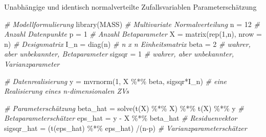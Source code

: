 \documentclass[
  8pt,
  ignorenonframetext,
]{beamer}
\newenvironment{Shaded}{\begin{snugshade}}{\end{snugshade}}
\newcommand{\AttributeTok}[1]{\textcolor[rgb]{0.77,0.63,0.00}{#1}}
\newcommand{\CommentTok}[1]{\textcolor[rgb]{0.56,0.35,0.01}{\textit{#1}}}
\newcommand{\DecValTok}[1]{\textcolor[rgb]{0.00,0.00,0.81}{#1}}
\newcommand{\FunctionTok}[1]{\textcolor[rgb]{0.00,0.00,0.00}{#1}}
\newcommand{\NormalTok}[1]{#1}
\newcommand{\OtherTok}[1]{\textcolor[rgb]{0.56,0.35,0.01}{#1}}
\newcommand{\SpecialCharTok}[1]{\textcolor[rgb]{0.00,0.00,0.00}{#1}}
\begin{document}
\begin{frame}[fragile]{Unabhängige und identisch normalverteilte
Zufallsvariablen}
\protect\hypertarget{unabhuxe4ngige-und-identisch-normalverteilte-zufallsvariablen-3}{}
Parameterschätzung \vspace{1mm}

\tiny

\begin{Shaded}
\begin{Highlighting}[]
\CommentTok{\# Modellformulierung}
\FunctionTok{library}\NormalTok{(MASS)                                     }\CommentTok{\# Multivariate Normalverteilung}
\NormalTok{n          }\OtherTok{=} \DecValTok{12}                                   \CommentTok{\# Anzahl Datenpunkte}
\NormalTok{p          }\OtherTok{=} \DecValTok{1}                                    \CommentTok{\# Anzahl Betaparameter}
\NormalTok{X          }\OtherTok{=} \FunctionTok{matrix}\NormalTok{(}\FunctionTok{rep}\NormalTok{(}\DecValTok{1}\NormalTok{,n), }\AttributeTok{nrow =}\NormalTok{ n)           }\CommentTok{\# Designmatrix}
\NormalTok{I\_n        }\OtherTok{=} \FunctionTok{diag}\NormalTok{(n)                              }\CommentTok{\# n x n Einheitsmatrix}
\NormalTok{beta       }\OtherTok{=} \DecValTok{2}                                    \CommentTok{\# wahrer, aber unbekannter, Betaparameter}
\NormalTok{sigsqr     }\OtherTok{=} \DecValTok{1}                                    \CommentTok{\# wahrer, aber unbekannter, Varianzparameter}

\CommentTok{\# Datenrealisierung}
\NormalTok{y          }\OtherTok{=}  \FunctionTok{mvrnorm}\NormalTok{(}\DecValTok{1}\NormalTok{, X }\SpecialCharTok{\%*\%}\NormalTok{ beta, sigsqr}\SpecialCharTok{*}\NormalTok{I\_n)  }\CommentTok{\# eine Realisierung eines n{-}dimensionalen ZVs}

\CommentTok{\# Parameterschätzung}
\NormalTok{beta\_hat   }\OtherTok{=} \FunctionTok{solve}\NormalTok{(}\FunctionTok{t}\NormalTok{(X) }\SpecialCharTok{\%*\%}\NormalTok{ X) }\SpecialCharTok{\%*\%} \FunctionTok{t}\NormalTok{(X) }\SpecialCharTok{\%*\%}\NormalTok{ y     }\CommentTok{\# Betaparameterschätzer}
\NormalTok{eps\_hat    }\OtherTok{=}\NormalTok{ y }\SpecialCharTok{{-}}\NormalTok{ X }\SpecialCharTok{\%*\%}\NormalTok{ beta\_hat                   }\CommentTok{\# Residuenvektor}
\NormalTok{sigsqr\_hat }\OtherTok{=}\NormalTok{ (}\FunctionTok{t}\NormalTok{(eps\_hat) }\SpecialCharTok{\%*\%}\NormalTok{ eps\_hat) }\SpecialCharTok{/}\NormalTok{(n}\SpecialCharTok{{-}}\NormalTok{p)      }\CommentTok{\# Varianzparameterschätzer}


\end{Highlighting}
\end{Shaded}
\end{frame}
\end{document}
